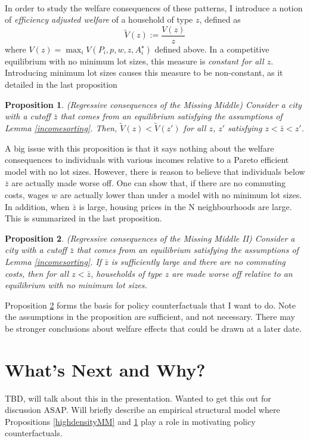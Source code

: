 \documentclass[]{article}
\theoremstyle{plain}
\newtheorem{prop}{Proposition}
\begin{document}
\paragraph*{}
In order to study the welfare consequences of these patterns, I introduce a notion of \textit{efficiency adjusted welfare} of a household of type $z$, defined as
\begin{equation}
	\tilde{V}(z) := \frac{V(z)}{z}
\end{equation}
where $V(z) = \max_{i}V(P_{i}, p, w, z, A_{i}^{\star})$ defined above. In a competitive equilibrium with no minimum lot sizes, this measure is \textit{constant for all $z$}. Introducing minimum lot sizes causes this measure to be non-constant, as it detailed in the last proposition
\begin{prop}\label{regressive}
	(Regressive consequences of the Missing Middle) Consider a city with a cutoff $\bar{z}$ that comes from an equilibrium satisfying the assumptions of Lemma \ref{incomesorting}. Then, $\tilde{V}(z) < \tilde{V}(z')$ for all $z$, $z'$ satisfying $z < \bar{z} < z'$.
\end{prop}
A big issue with this proposition is that it says nothing about the welfare consequences to individuals with various incomes relative to a Pareto efficient model with no lot sizes. However, there is reason to believe that individuals below $\bar{z}$ are actually made worse off. One can show that, if there are no commuting costs, wages $w$ are actually lower than under a model with no minimum lot sizes. In addition, when $\bar{z}$ is large, housing prices in the N neighbourhoods are large. This is summarized in the last proposition.

\begin{prop}\label{regressiveII}
(Regressive consequences of the Missing Middle II) Consider a city with a cutoff $\bar{z}$ that comes from an equilibrium satisfying the assumptions of Lemma \ref{incomesorting}. If $\bar{z}$ is sufficiently large and there are no commuting costs, then for all $z < \bar{z}$, households of type $z$ are made worse off relative to an equilibrium with no minimum lot sizes. 
\end{prop}
Proposition \ref{regressiveII} forms the basis for policy counterfactuals that I want to do. Note the assumptions in the proposition are sufficient, and not necessary. There may be stronger conclusions about welfare effects that could be drawn at a later date.  

\section{What's Next and Why?}
TBD, will talk about this in the presentation. Wanted to get this out for discussion ASAP. Will briefly describe an empirical structural model where Propositions \ref{highdensityMM} and \ref{regressive} play a role in motivating policy counterfactuals. 
\end{document}
